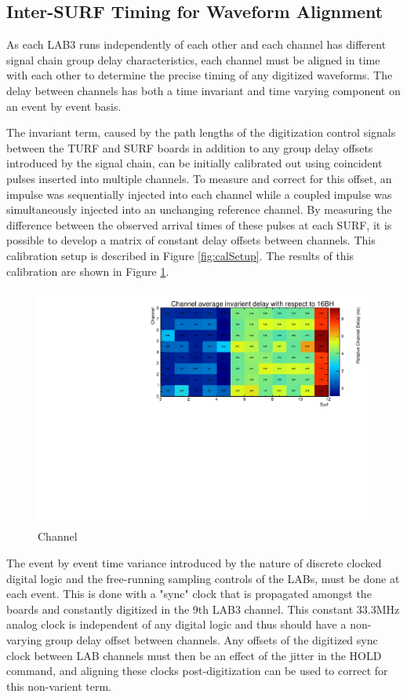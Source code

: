 		
	\subsection{Inter-SURF Timing for Waveform Alignment}	
		As each LAB3 runs independently of each other and each channel has different signal chain group delay characteristics, each channel must be aligned in time with each other to determine the precise timing of any digitized waveforms.  The delay between channels has both a time invariant and time varying component on an event by event basis.  
		
		The invariant term, caused by the path lengths of the digitization control signals between the TURF and SURF boards in addition to any group delay offsets introduced by the signal chain, can be initially calibrated out using coincident pulses inserted into multiple channels.  To measure and correct for this offset, an impulse was sequentially injected into each channel while a coupled impulse was simultaneously injected into an unchanging reference channel.  By measuring the difference between the observed arrival times of these pulses at each SURF, it is possible to develop a matrix of constant delay offsets between channels.  This calibration setup is described in Figure \ref{fig:calSetup}.  The results of this calibration are shown in Figure \ref{fig:delayOffsets}.
		

	\begin{figure}
		\includegraphics[width=\textwidth]{figures/averagedCableDelay}
		\caption{Channel}
		\label{fig:delayOffsets}
	\end{figure}
		
		
		The event by event time variance introduced by the nature of discrete clocked digital logic and the free-running sampling controls of the LABs, must be done at each event.  This is done with a "sync" clock that is propagated amongst the boards and constantly digitized in the 9th LAB3 channel.  This constant  33.3MHz analog clock is independent of any digital logic and thus should have a non-varying group delay offset between channels.  Any offsets of the digitized sync clock between LAB channels must then be an effect of the jitter in the HOLD command, and aligning these clocks post-digitization can be used to correct for this non-varient term.
		



